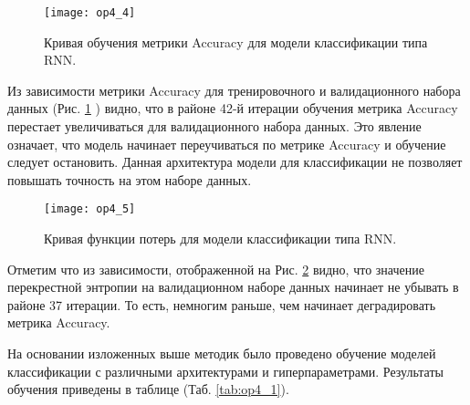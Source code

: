 \begin{figure}[ht]
  \centering
  \texttt{[image: op4\_4]}
  \caption{Кривая обучения метрики Accuracy для модели классификации типа RNN.}
  \label{fig:op4_4}
\end{figure}

Из зависимости метрики Accuracy для тренировочного и валидационного набора данных (Рис. \ref{fig:op4_4} ) видно, что в районе 42-й итерации обучения метрика Accuracy перестает увеличиваться для валидационного набора данных. 
Это явление означает, что модель начинает переучиваться по метрике Accuracy и обучение следует остановить. 
Данная архитектура модели для классификации не позволяет повышать точность на этом наборе данных.  

\begin{figure}[H]
  \caption{Кривая функции потерь для модели классификации типа RNN.}
  \centering
    \texttt{[image: op4\_5]}
  \label{fig:op4_5}
\end{figure}

Отметим что из зависимости, отображенной на Рис. \ref{fig:op4_5} видно, что значение перекрестной энтропии на валидационном наборе данных начинает не убывать в районе 37 итерации. 
То есть, немногим раньше, чем начинает деградировать метрика Accuracy. 

На основании изложенных выше методик было проведено обучение моделей классификации с различными архитектурами и гиперпараметрами. 
Результаты обучения приведены в таблице (Таб. \ref{tab:op4_1}).

\begin{table}[H]
\centering
\caption{Результаты обучения моделей классификации с различными гиперпараметрами.}
\label{tab:op4_1}
\end{table}

